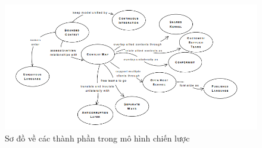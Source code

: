     \begin{figure}[H]
    
    \centering
    
    \includegraphics[scale = 0.9]{pictures/cac_mau_chien_luoc/temp.png}
    
    \caption{Sơ đồ về các thành phần trong mô hình chiến lược}
    
    \end{figure}
    
    
    
    
    
    
    
    
    
    
    
    